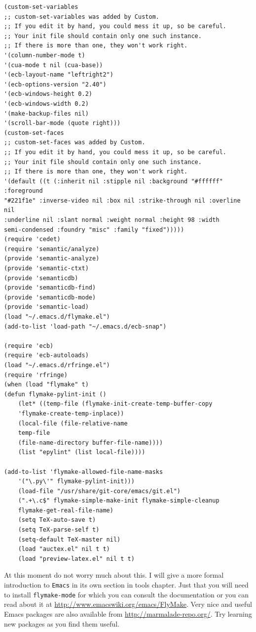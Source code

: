 \begin{verbatim}
(custom-set-variables
;; custom-set-variables was added by Custom.
;; If you edit it by hand, you could mess it up, so be careful.
;; Your init file should contain only one such instance.
;; If there is more than one, they won't work right.
'(column-number-mode t)
'(cua-mode t nil (cua-base))
'(ecb-layout-name "leftright2")
'(ecb-options-version "2.40")
'(ecb-windows-height 0.2)
'(ecb-windows-width 0.2)
'(make-backup-files nil)
'(scroll-bar-mode (quote right)))
(custom-set-faces
;; custom-set-faces was added by Custom.
;; If you edit it by hand, you could mess it up, so be careful.
;; Your init file should contain only one such instance.
;; If there is more than one, they won't work right.
'(default ((t (:inherit nil :stipple nil :background "#ffffff" :foreground
"#221f1e" :inverse-video nil :box nil :strike-through nil :overline nil
:underline nil :slant normal :weight normal :height 98 :width
semi-condensed :foundry "misc" :family "fixed")))))
(require 'cedet)
(require 'semantic/analyze)
(provide 'semantic-analyze)
(provide 'semantic-ctxt)
(provide 'semanticdb)
(provide 'semanticdb-find)
(provide 'semanticdb-mode)
(provide 'semantic-load)
(load "~/.emacs.d/flymake.el")
(add-to-list 'load-path "~/.emacs.d/ecb-snap")

(require 'ecb)
(require 'ecb-autoloads)
(load "~/.emacs.d/rfringe.el")
(require 'rfringe)
(when (load "flymake" t)
(defun flymake-pylint-init ()
    (let* ((temp-file (flymake-init-create-temp-buffer-copy
    'flymake-create-temp-inplace))
    (local-file (file-relative-name
    temp-file
    (file-name-directory buffer-file-name))))
    (list "epylint" (list local-file))))

(add-to-list 'flymake-allowed-file-name-masks
    '("\.py\'" flymake-pylint-init)))
    (load-file "/usr/share/git-core/emacs/git.el")
    (".+\.c$" flymake-simple-make-init flymake-simple-cleanup
    flymake-get-real-file-name)
    (setq TeX-auto-save t)
    (setq TeX-parse-self t)
    (setq-default TeX-master nil)
    (load "auctex.el" nil t t)
    (load "preview-latex.el" nil t t)
\end{verbatim}

At this moment do not worry much about this. I will give a more formal
introduction to \texttt{Emacs} in its own section in tools chapter.
Just that you will need to install \texttt{flymake-mode} for which you can
consult the documentation or you can read about it at
\url{http://www.emacswiki.org/emacs/FlyMake}. Very nice and useful Emacs
packages are also available from \url{http://marmalade-repo.org/}. Try
learning new packages as you find them useful. 

